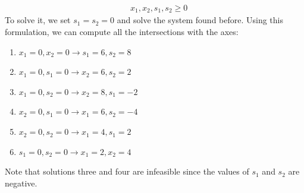 \begin{example}
\begin{align*}
                                    &\: x_1,x_2,s_1,s_2 \geq 0
    \end{align*}
    To solve it, we set $s_1=s_2=0$ and solve the system found before.
    Using this formulation, we can compute all the intersections with the axes:
    \begin{enumerate}
        \item $x_1=0,x_2=0 \rightarrow s_1=6,s_2=8$
        \item $x_1=0,s_1=0 \rightarrow x_2=6,s_2=2$
        \item $x_1=0,s_2=0 \rightarrow x_2=8,s_1=-2$
        \item $x_2=0,s_1=0 \rightarrow x_1=6,s_2=-4$
        \item $x_2=0,s_2=0 \rightarrow x_1=4,s_1=2$
        \item $s_1=0,s_2=0 \rightarrow x_1=2,x_2=4$
    \end{enumerate}
    Note that solutions three and four are infeasible since the values of $s_1$ and $s_2$ are negative. 
\end{example}

